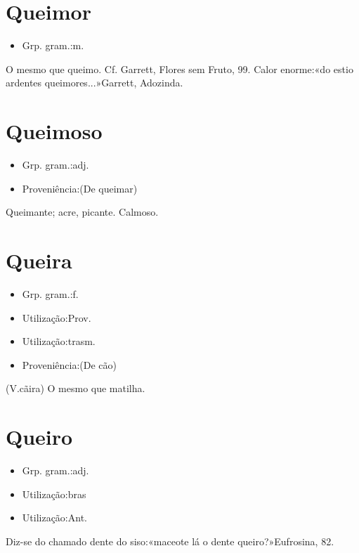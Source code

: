 \section{Queimor}
\begin{itemize}
\item {Grp. gram.:m.}
\end{itemize}
O mesmo que \textunderscore queimo\textunderscore . Cf. Garrett, \textunderscore Flores sem Fruto\textunderscore , 99.
Calor enorme:«\textunderscore do estio ardentes queimores...\textunderscore »Garrett, \textunderscore Adozinda\textunderscore .
\section{Queimoso}
\begin{itemize}
\item {Grp. gram.:adj.}
\end{itemize}
\begin{itemize}
\item {Proveniência:(De \textunderscore queimar\textunderscore )}
\end{itemize}
Queimante; acre, picante.
Calmoso.
\section{Queira}
\begin{itemize}
\item {Grp. gram.:f.}
\end{itemize}
\begin{itemize}
\item {Utilização:Prov.}
\end{itemize}
\begin{itemize}
\item {Utilização:trasm.}
\end{itemize}
\begin{itemize}
\item {Proveniência:(De \textunderscore cão\textunderscore )}
\end{itemize}
(V.cãira)
O mesmo que \textunderscore matilha\textunderscore .
\section{Queiro}
\begin{itemize}
\item {Grp. gram.:adj.}
\end{itemize}
\begin{itemize}
\item {Utilização:bras}
\end{itemize}
\begin{itemize}
\item {Utilização:Ant.}
\end{itemize}
Diz-se do chamado \textunderscore dente do siso\textunderscore :«\textunderscore maceote lá o dente queiro?\textunderscore »\textunderscore Eufrosina\textunderscore , 82.
